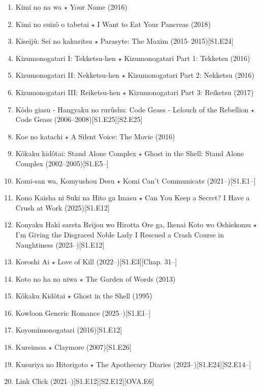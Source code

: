 \documentclass{article}
\begin{document}
\begin{enumerate}
    {\sf Comment.} WTF is this anime?
    \item {\sc Kimi no na wa $\star$ Your Name} (2016)
    \item {\sc Kimi no suiz\^o o tabetai $\star$ I Want to Eat Your Pancreas} (2018)
    \item {\sc Kiseij\^u: Sei no kakuritsu $\star$ Parasyte: The Maxim} (2015--2015)\hfill[S1.E24]
    \item {\sc Kizumonogatari I: Tekketsu-hen $\star$ Kizumonogatari Part 1: Tekketsu} (2016)
    \item {\sc Kizumonogatari II: Nekketsu-hen $\star$ Kizumonogatari Part 2: Nekketsu} (2016)
    \item {\sc Kizumonogatari III: Reiketsu-hen $\star$ Kizumonogatari Part 3: Reiketsu} (2017)
    \item {\sc Kôdo giasu - Hangyaku no rurûshu: Code Geass - Lelouch of the Rebellion $\star$ Code Geass} (2006--2008)\hfill[S1.E25][S2.E25]
    \item {\sc Koe no katachi $\star$ A Silent Voice: The Movie} (2016)
    \item Kôkaku kidôtai: Stand Alone Complex $\star$ Ghost in the Shell: Stand Alone Complex (2002--2005)\hfill[S1.E5--]
    \item Komi-san wa, Komyushou Desu $\star$ Komi Can't Communicate (2021--)\hfill[S1.E1--]
    \item {\sc Kono Kaisha ni Suki na Hito ga Imasu $\star$ Can You Keep a Secret? I Have a Crush at Work} (2025)\hfill[S1.E12]
    \item {\sc Konyaku Haki sareta Reijou wo Hirotta Ore ga, Ikenai Koto wo Oshiekomu $\star$ I'm Giving the Disgraced Noble Lady I Rescued a Crash Course in Naughtiness} (2023--)\hfill[S1.E12]
    \item Koroshi Ai $\star$ Love of Kill (2022--)\hfill[S1.E3][Chap. 31--]
    \item {\sc Koto no ha no niwa $\star$ The Garden of Words} (2013)
    \item {\sc K\^okaku Kid\^otai $\star$ Ghost in the Shell} (1995)
    \item Kowloon Generic Romance (2025--)\hfill[S1.E1--]
    \item {\sc Koyomimonogatari} (2016)\hfill[S1.E12]
    \item {\sc Kureimoa $\star$ Claymore} (2007)\hfill[S1.E26]
    \item {\sc Kusuriya no Hitorigoto $\star$ The Apothecary Diaries} (2023--)\hfill[S1.E24][S2.E14--]
    \item Link Click (2021--)\hfill[S1.E12][S2.E12][OVA.E6]

\end{enumerate}
\end{document}
